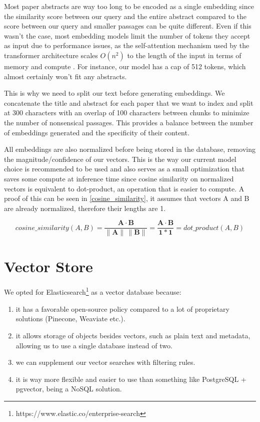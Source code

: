 \documentclass[12pt,a4paper]{report}
\begin{document}
Most paper abstracts are way too long to be encoded as a single embedding since the similarity score between our query and the entire abstract compared to the score between our query and smaller passages can be quite different. Even if this wasn't the case, most embedding models limit the number of tokens they accept as input due to performance issues, as the self-attention mechanism used by the transformer architecture scales \(O(n^2)\) to the length of the input in terms of memory and compute \cite{Pawar2024TheWW}. For instance, our model has a cap of 512 tokens, which almost certainly won't fit any abstracts.

This is why we need to split our text before generating embeddings. We concatenate the title and abstract for each paper that we want to index and split at 300 characters with an overlap of 100 characters between chunks to minimize the number of nonsensical passages. This provides a balance between the number of embeddings generated and the specificity of their content.

All embeddings are also normalized before being stored in the database, removing the magnitude/confidence of our vectors. This is the way our current model choice is recommended to be used and also serves as a small optimization that saves some compute at inference time since cosine similarity on normalized vectors is equivalent to dot-product, an operation that is easier to compute. A proof of this can be seen in \autoref{cosine_similarity}, it assumes that vectors A and B are already normalized, therefore their lengths are 1.

\begin{equation} \label{cosine_similarity}
cosine\_similarity(A, B) =  \frac{\mathbf{A} \cdot \mathbf{B}}{\|\mathbf{A}\| \, \|\mathbf{B}\|} = \frac{\mathbf{A} \cdot \mathbf{B}}{\mathbf{1} * \mathbf{1}} = dot\_product(A, B)
\end{equation}

\section{Vector Store}

We opted for Elasticsearch\footnote{https://www.elastic.co/enterprise-search} as a vector database because:
\begin{enumerate}
    \item it has a favorable open-source policy compared to a lot of proprietary solutions (Pinecone, Weaviate etc.).
    \item it allows storage of objects besides vectors, such as plain text and metadata, allowing us to use a single database instead of two.
    \item we can supplement our vector searches with filtering rules.
    \item it is way more flexible and easier to use than something like PostgreSQL + pgvector, being a NoSQL solution.
\end{enumerate}
\end{document}
